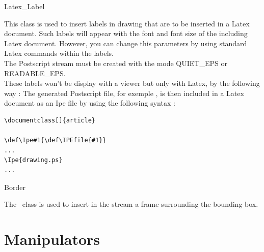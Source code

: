 \begin{ccClass}{Latex_Label}

\ccDefinition
This class is used to insert labels in drawing that are to be inserted 
in a Latex document.
Such labels will appear with the font and font size of the including
Latex document.
However, you can
change this parameters by using standard Latex commands within the labels.\\
The Postscript stream must be created with the mode QUIET\_EPS or READABLE\_EPS.\\
These labels won't be display with a viewer but only with Latex, by
the following way :
The generated Postscript file, for exemple , is then
included in a Latex document as an {\sc Ipe} file by using the
following syntax :

\begin{verbatim}
\documentclass[]{article}

\def\Ipe#1{\def\IPEfile{#1}}
...
\Ipe{drawing.ps}
...

\end{verbatim}


\ccCreation
{}



\end{ccClass}

\begin{ccClass}{Border}

\ccDefinition
The \ccClassName\ class is used to insert in the stream a frame
surrounding the bounding box.

\ccCreation
{}


\ccAccessFunctions

\ccGlue

\end{ccClass}
\par


\section{Manipulators}

